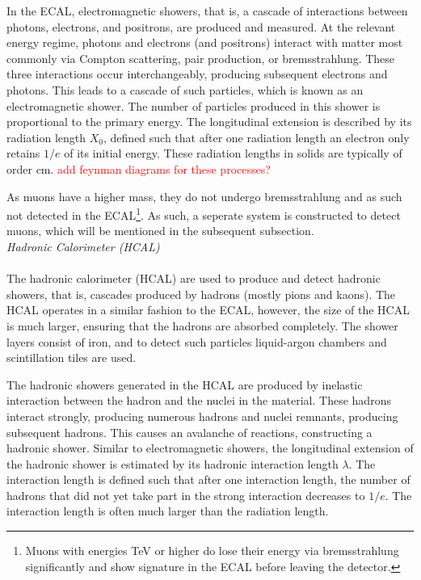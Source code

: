 \documentclass[a4paper]{report}
\numberwithin{equation}{section}
\begin{document}
In the ECAL, electromagnetic showers, that is, a cascade of interactions between photons, electrons, and positrons, are produced and measured. At the relevant energy 
regime, photons and electrons (and positrons) interact with matter most commonly via Compton scattering, pair production, or bremsstrahlung. 
These three interactions occur interchangeably, producing subsequent electrons and photons. This leads to a cascade of such particles, which is known as an 
electromagnetic shower. The number of particles produced in this shower is proportional to the primary energy. 
The longitudinal extension is described by its radiation length $X_0$, defined such that after one radiation length an electron only retains 
$1 / e$ of its initial energy. These radiation lengths in solids are typically of order cm. \textcolor{red}{add feynman diagrams for 
these processes?}\par 

As muons have a higher mass, they do not undergo bremsstrahlung and as such not detected in the ECAL\footnote{Muons with energies TeV or higher do lose their energy via 
bremsstrahlung significantly and show signature in the ECAL before leaving the detector.}. As such, a seperate system is constructed to detect muons, which will be mentioned 
in the subsequent subsection. \\

\noindent \textit{Hadronic Calorimeter (HCAL)} \\ \\
The hadronic calorimeter (HCAL) are used to produce and detect hadronic showers, that is, cascades produced by hadrons (mostly pions and kaons). 
The HCAL operates in a similar fashion to the ECAL, however, the size of the HCAL is much larger, ensuring that the hadrons are absorbed completely. The shower layers 
consist of iron, and to detect such particles liquid-argon chambers and scintillation tiles are used. \par 

The hadronic showers generated in the HCAL are produced by inelastic interaction between the hadron and the nuclei in the material. These hadrons interact strongly, 
producing numerous hadrons and nuclei remnants, producing subsequent hadrons. This causes an avalanche of reactions, constructing a hadronic shower. Similar to 
electromagnetic showers, the longitudinal extension of the hadronic shower is estimated by its hadronic interaction length $\lambda$. The interaction length is 
defined such that after one interaction length, the number of hadrons that did not yet take part in the strong interaction decreases to $1 / e$. The interaction 
length is often much larger than the radiation length. 
\end{document}
